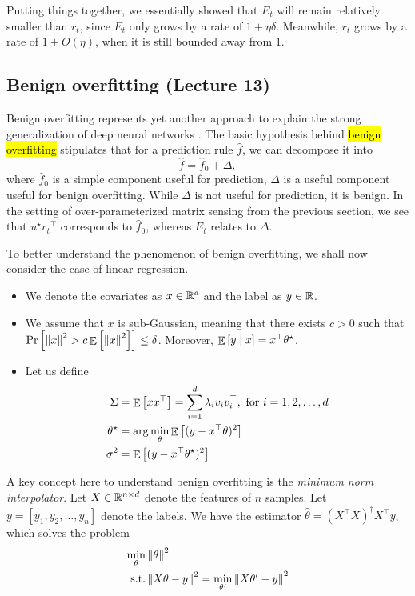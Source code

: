 Putting things together, we essentially showed that $E_t$ will remain relatively smaller than $r_t$, since $E_t$ only grows by a rate of $1 + \eta \delta$.
Meanwhile, $r_t$ grows by a rate of $1 + O(\eta)$, when it is still bounded away from $1$.

\subsection{Benign overfitting (Lecture 13)}

Benign overfitting represents yet another approach to explain the strong generalization of deep neural networks \citep{bartlett2020benign}.
The basic hypothesis behind \hl{benign overfitting} stipulates that for a prediction rule $\hat f$, we can decompose it into
\[ \hat f = \hat f_0 + \Delta,  \]
where $\hat f_0$ is a simple component useful for prediction, $\Delta$ is a useful component useful for benign overfitting.
While $\Delta$ is not useful for prediction, it is benign.
In the setting of over-parameterized matrix sensing from the previous section, we see that $u^{\star }{r_t}^{\top}$ corresponds to $\hat f_0$, whereas $E_t$ relates to $\Delta$.

To better understand the phenomenon of benign overfitting, we shall now consider the case of linear regression.
\begin{itemize}
    \item We denote the covariates as $x \in \mathbb{R}^d$ and the label as $y \in \mathbb{R}$.
    \item We assume that $x$ is sub-Gaussian, meaning that there exists $c > 0$ such that $\Pr\left[\left\| x \right\|^2 > c \mathop{\mathbb{E}}\left[ \left\| x \right\|^2 \right]\right] \le \delta$.
    Moreover, $\mathop{\mathbb{E}}\left[ y \mid x \right] = x^{\top} \theta^{\star}$.
    \item Let us define
    \begin{align*}
        \Sigma &= \mathop{\mathbb{E}}\left[ x x^{\top} \right] = \sum_{i=1}^d \lambda_i v_i v_i^{\top}, \text{ for } i = 1, 2, \dots, d \\
        \theta^{\star} &= \arg \min_{\theta} \mathop{\mathbb{E}}\left[ (y - x^{\top} \theta)^2  \right] \\
        \sigma^2 &= \mathop{\mathbb{E}}\left[ (y - x^{\top} \theta^{\star})^2 \right]
    \end{align*}
\end{itemize}

A key concept here to understand benign overfitting is the \emph{minimum norm interpolator}.
Let $X \in \mathbb{R}^{n \times d}$ denote the features of $n$ samples.
Let $y = [y_1, y_2, \dots, y_n]$ denote the labels.
We have the estimator $\hat \theta = (X^{\top} X)^{\dagger} X^{\top} y$, which solves the problem
\begin{align*}
    \min_{\theta} & \left\| \theta \right\|^2 \\
    \mbox{s.t.} & \left\| X \theta - y \right\|^2 = \min_{\theta'} \left\| X \theta' - y \right\|^2
\end{align*}


